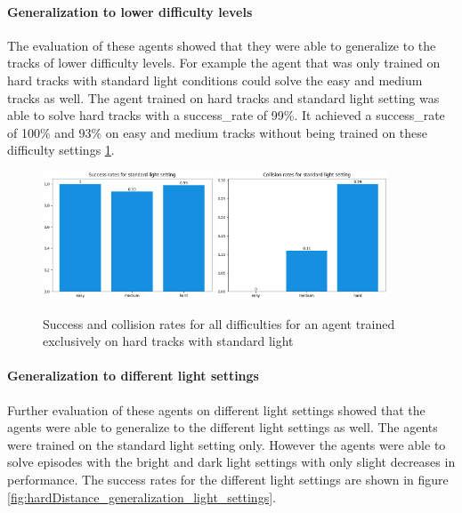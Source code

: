 \paragraph{Generalization to lower difficulty levels} The evaluation of these agents showed that they were able to generalize to the tracks of lower difficulty levels. For example the agent that was only trained on hard tracks with standard light conditions could solve the easy and medium tracks as well. The agent trained on hard tracks and standard light setting was able to solve hard tracks with a success\_rate of 99\%. It achieved a success\_rate of 100\% and 93\% on easy and medium tracks without being trained on these difficulty settings \ref{fig:hardDistance_generalization}.

\begin{figure}
    \centering
    \includegraphics[width=0.45\textwidth]{Bilder/notebook_images/hardDistanceStandardLight_eval_standard_success_rates_barplot.png}
    \includegraphics[width=0.45\textwidth]{Bilder/notebook_images/hardDistanceStandardLight_eval_standard_collision_rates_barplot.png}
    \caption{Success and collision rates for all difficulties for an agent trained exclusively on hard tracks with standard light}
    \label{fig:hardDistance_generalization}
\end{figure}

\paragraph{Generalization to different light settings}
Further evaluation of these agents on different light settings showed that the agents were able to generalize to the different light settings as well. The agents were trained on the standard light setting only. However the agents were able to solve episodes with the bright and dark light settings with only slight decreases in performance. The success rates for the different light settings are shown in figure \ref{fig:hardDistance_generalization_light_settings}.

